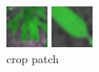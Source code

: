 \documentclass[]{report}
\begin{document}
\begin{figure}[!htb]
  \includegraphics[width=\linewidth]{crop.png}
  \caption{crop patch}\label{fig:crop sample}
\endminipage\hfill
{}
  \includegraphics[width=\linewidth]{weed.png}

\end{figure}
\end{document}

